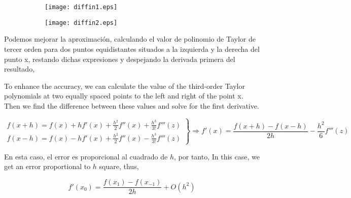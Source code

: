 \begin{figure}[h]
\centering
\begin{subfigure}{0.45\textwidth}
	\texttt{[image: diffin1.eps]}
	 \label{fig:diffin1}
\end{subfigure} 
\begin{subfigure}{0.45\textwidth}
	\texttt{[image: diffin2.eps]}
	 \label{fig:diffin2}
\end{subfigure}
\label{fig:diffin}
\end{figure}
\begin{paracol}{2}
Podemos mejorar la aproximación, calculando el valor de polinomio de Taylor de tercer orden para dos puntos equidistantes situados a la izquierda y la derecha del punto x, restando dichas expresiones y despejando la derivada primera del resultado,

\switchcolumn

To enhance the accuracy, we can calculate the value of the third-order Taylor polynomials at two equally spaced points to the left and right of the point x. Then we find the difference between these values and solve for the first derivative.
\end{paracol}
\begin{equation*}
\left. \begin{aligned}
f(x+h)=f(x)+hf'(x)+\frac{h^2}{2}f''(x)+\frac{h^3}{3!}f'''(z)\\
f(x-h)=f(x)-hf'(x)+\frac{h^2}{2}f''(x)-\frac{h^3}{3!}f'''(z)
\end{aligned} \right\rbrace \Rightarrow f'(x)=\frac{f(x+h)-f(x-h)}{2h}-\frac{h^2}{6}f'''(z) 
\end{equation*}
\begin{paracol}{2}
En esta caso, el error es proporcional al cuadrado de $h$, por tanto,
\switchcolumn
In this case, we get an error proportional to $h$ square, thus,
\end{paracol}
\begin{equation*}
f'(x_0)=\frac{f(x_1)-f(x_{-1})}
{2h}+O(h^2)
\end{equation*}

